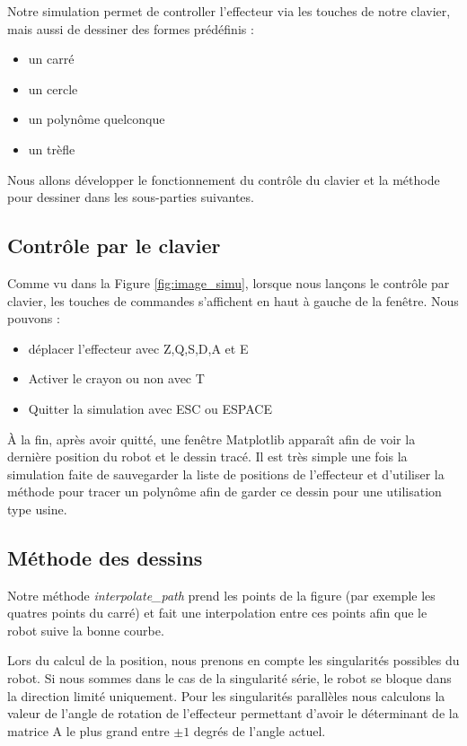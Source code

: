 \documentclass[a4paper, 11pt]{report}
\begin{document}
Notre simulation permet de controller l'effecteur via les touches de notre clavier, mais aussi de dessiner des formes prédéfinis :
\begin{itemize}
    \item un carré
    \item un cercle
    \item un polynôme quelconque
    \item un trèfle
\end{itemize}
Nous allons développer le fonctionnement du contrôle du clavier et la méthode pour dessiner dans les sous-parties suivantes.

\subsection{Contrôle par le clavier}
Comme vu dans la Figure \ref{fig:image_simu}, lorsque nous lançons le contrôle par clavier, les touches de commandes s'affichent en haut à gauche de la fenêtre. Nous pouvons :
\begin{itemize}
    \item déplacer l'effecteur avec Z,Q,S,D,A et E
    \item Activer le crayon ou non avec T
    \item Quitter la simulation avec ESC ou ESPACE
\end{itemize}
À la fin, après avoir quitté, une fenêtre Matplotlib apparaît afin de voir la dernière position du robot et le dessin tracé. Il est très simple une fois la simulation faite de sauvegarder la liste de positions de l'effecteur et d'utiliser la méthode pour tracer un polynôme afin de garder ce dessin pour une utilisation type usine.

\subsection{Méthode des dessins}

Notre méthode \textit{interpolate\_path} prend les points de la figure (par exemple les quatres points du carré) et fait une interpolation entre ces points afin que le robot suive la bonne courbe.

Lors du calcul de la position, nous prenons en compte les singularités possibles du robot. Si nous sommes dans le cas de la singularité série, le robot se bloque dans la direction limité uniquement. Pour les singularités parallèles nous calculons la valeur de l'angle de rotation de l'effecteur permettant d'avoir le déterminant de la matrice A le plus grand entre $\pm1$ degrés de l'angle actuel.
\end{document}
